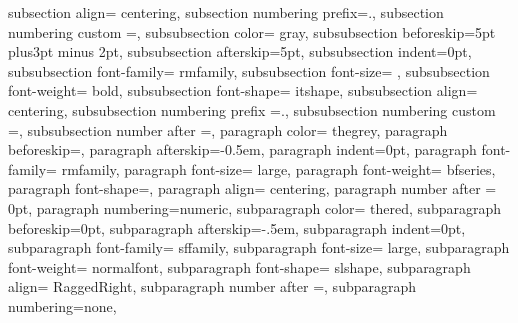{{       subsection align= centering,
       subsection numbering prefix=\thesection.,%
       subsection numbering custom =\@arabic\c@subsection,%
       subsubsection color= gray,
       subsubsection beforeskip=5pt plus3pt minus 2pt,
       subsubsection afterskip=5pt,
       subsubsection indent=0pt,
       subsubsection font-family= rmfamily,
       subsubsection font-size= \large,  %
       subsubsection font-weight= bold,
       subsubsection font-shape= itshape,
       subsubsection align= centering,
       subsubsection numbering prefix =\thesubsection.\@arabic\c@subsubsection,
       subsubsection numbering custom =, %
       subsubsection number after =, 
%
       paragraph color= thegrey,
       paragraph beforeskip=,
       paragraph afterskip=-0.5em,
       paragraph indent=0pt,
       paragraph font-family= rmfamily,
       paragraph font-size= large,
       paragraph font-weight= bfseries,
       paragraph font-shape=,
       paragraph align= centering,
       paragraph number after = 0pt,
       paragraph numbering=numeric,
       subparagraph color= thered,
       subparagraph beforeskip=0pt,
       subparagraph afterskip=-.5em,
       subparagraph indent=0pt,
       subparagraph font-family= sffamily,
       subparagraph font-size= large,
       subparagraph font-weight= normalfont,
       subparagraph font-shape= slshape,
       subparagraph align= RaggedRight,
       subparagraph number after =, %
       subparagraph numbering=none,
     }
}

